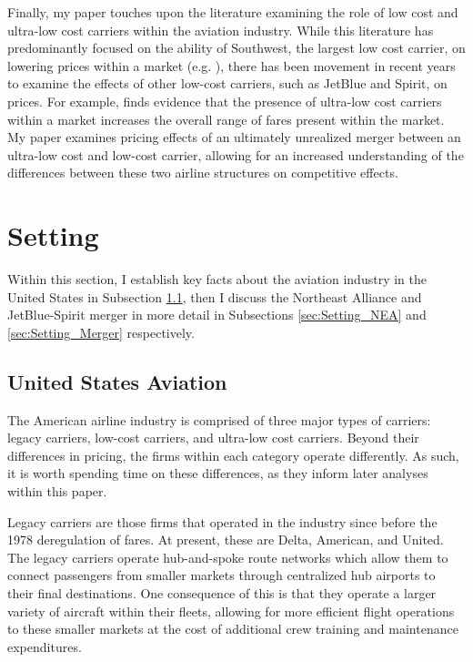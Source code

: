 \documentclass{article}
\begin{document}
	Finally, my paper touches upon the literature examining the role of low cost and ultra-low cost carriers within the aviation industry. While this literature has predominantly focused on the ability of Southwest, the largest low cost carrier, on lowering prices within a market (e.g. \citet{windle_short_1995, morrison_actual_2001,  goolsbee_how_2008}), there has been movement in recent years to examine the effects of other low-cost carriers, such as JetBlue and Spirit, on prices. For example, \citet{shrago_spirit_2024} finds evidence that the presence of ultra-low cost carriers within a market increases the overall range of fares present within the market. My paper examines pricing effects of an ultimately unrealized merger between an ultra-low cost and low-cost carrier, allowing for an increased understanding of the differences between these two airline structures on competitive effects.  
	
	\section{Setting}
	\label{sec:Setting}
	
	Within this section, I establish key facts about the aviation industry in the United States in Subsection \ref{sec:Setting_Aviation}, then I discuss the Northeast Alliance and JetBlue-Spirit merger in more detail in Subsections \ref{sec:Setting_NEA} and \ref{sec:Setting_Merger} respectively.
	
	\subsection{United States Aviation}
	\label{sec:Setting_Aviation}
	The American airline industry is comprised of three major types of carriers: legacy carriers, low-cost carriers, and ultra-low cost carriers. Beyond their differences in pricing, the firms within each category operate differently. As such, it is worth spending time on these differences, as they inform later analyses within this paper.
	
	Legacy carriers are those firms that operated in the industry since before the 1978 deregulation of fares. At present, these are Delta, American, and United. The legacy carriers operate hub-and-spoke route networks which allow them to connect passengers from smaller markets through centralized hub airports to their final destinations. One consequence of this is that they operate a larger variety of aircraft within their fleets, allowing for more efficient flight operations to these smaller markets at the cost of additional crew training and maintenance expenditures.   
	
\end{document}
